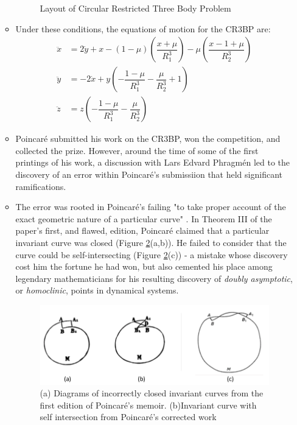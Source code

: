 \documentclass{article}
\begin{document}
\begin{itemize}
\begin{itemize}
\begin{figure}
	  	\caption{Layout of Circular Restricted Three Body Problem \cite{KoonLoMarsdenRoss2011}}
		\label{fig:CR3BP}
	  	\end{figure}
		\item Under these conditions, the equations of motion for the CR3BP are:
	  	\begin{align}
	  	\ddot{x} &=  2\dot{y} + x - (1-\mu)\left(\dfrac{x+\mu}{R_1^3}\right) - \mu\left(\dfrac{x-1+\mu}{R_2^3}\right)\\
		\ddot{y} &= - 2\dot{x} + y\left(-\dfrac{1-\mu}{R_1^3} - \dfrac{\mu}{R_2^3} + 1\right) \\
		\ddot{z} &= z\left(-\dfrac{1 - \mu}{R_1^3} - \dfrac{\mu}{R_2^3}\right)
		\end{align}
	  	\item Poincaré submitted his work on the CR3BP, won the competition, and collected the prize. However, around the time of some of the first printings of his work, a discussion with Lars Edvard Phragmén led to the discovery of an error within Poincaré's submissiion that held significant ramifications.
	  	\item The error was rooted in Poincaré's failing "to take proper account of the exact geometric nature of a particular curve" \cite{BarrowGreen1997}. In Theorem III of the paper's first, and flawed, edition, Poincaré claimed that a particular invariant curve was closed (Figure \ref{fig:curveIntersection1}(a,b)). He failed to consider that the curve could be self-intersecting (Figure \ref{fig:curveIntersection1}(c)) - a mistake whose discovery cost him the fortune he had won, but also cemented his place among legendary mathematicians for his resulting discovery of \textit{doubly asymptotic}, or \textit{homoclinic}, points in dynamical systems.
	  	\begin{figure}
	  	\centering
	  	\includegraphics[scale=0.4]{curveIntersection1.png}\nonumber
	  	\caption{(a) Diagrams of incorrectly closed invariant curves from the first edition of Poincaré's memoir. (b)Invariant curve with self intersection from Poincaré's corrected work \cite{BarrowGreen1997}}
		\label{fig:curveIntersection1}
	  	\end{figure}


\end{itemize}
\end{itemize}
\end{document}
